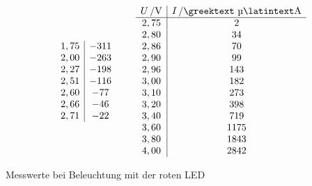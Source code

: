 \documentclass[numbers=noenddot,12pt,a4paper]{scrartcl}
\newcommand{\greek}[1]{\greektext#1\latintext}
\begin{document}
\begin{table}[H]
\begin{align*}
\begin{array}{c|c}
	1,75 & -311 \\
	2,00 & -263 \\
	2,27 & -198 \\
	2,51 & -116 \\
	2,60 & -77 \\
	2,66 & -46 \\
	2,71 & -22 \\
	\end{array}
	\hspace{2em}
	\begin{array}{c|c}
	\unit[U]{/V} & \unit[I]{/\text{\greek{µ}}A}\\\hline
	2,75 & 2 \\
	2,80 & 34 \\
	2,86 & 70 \\
	2,90 & 99 \\
	2,96 & 143 \\
	3,00 & 182 \\
	3,10 & 273 \\
	3,20 & 398 \\
	3,40 & 719 \\
	3,60 & 1175 \\
	3,80 & 1843 \\
	4,00 & 2842
\end{array}  
\end{align*}
\vspace{-1em}
\caption{Messwerte bei Beleuchtung mit der roten LED}
\end{table}
\end{document}
